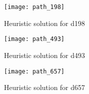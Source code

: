 \begin{figure}[H]
	\centering
	\texttt{[image: path\_198]}
	\caption{Heuristic solution for d198}
	\label{fig:p198}
\end{figure}

\begin{figure}[H]
	\centering
	\texttt{[image: path\_493]}
	\caption{Heuristic solution for d493}
	\label{fig:p493}
\end{figure}

\begin{figure}[H]
	\centering
	\texttt{[image: path\_657]}
	\caption{Heuristic solution for d657}
	\label{fig:p657}
\end{figure}


